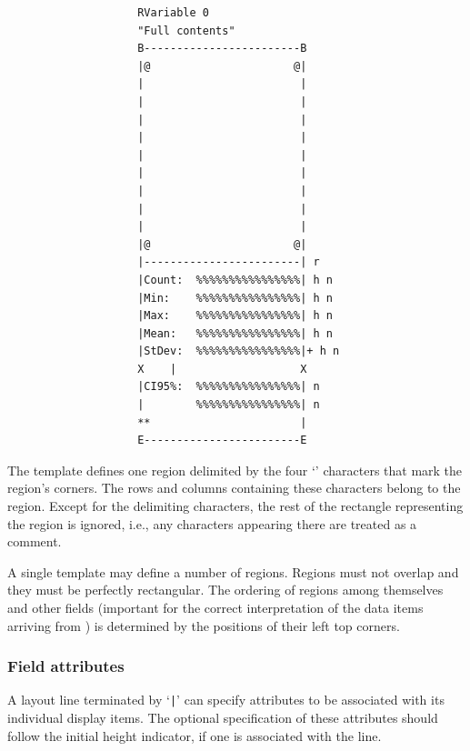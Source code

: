 {\small
\begin{verbatim}
                    RVariable 0
                    "Full contents"
                    B------------------------B
                    |@                      @|
                    |                        |
                    |                        |
                    |                        |
                    |                        |
                    |                        |
                    |                        |
                    |                        |
                    |                        |
                    |                        |
                    |@                      @|
                    |------------------------| r
                    |Count:  %%%%%%%%%%%%%%%%| h n
                    |Min:    %%%%%%%%%%%%%%%%| h n
                    |Max:    %%%%%%%%%%%%%%%%| h n
                    |Mean:   %%%%%%%%%%%%%%%%| h n
                    |StDev:  %%%%%%%%%%%%%%%%|+ h n
                    X    |                   X
                    |CI95%:  %%%%%%%%%%%%%%%%| n
                    |        %%%%%%%%%%%%%%%%| n
                    **                       |
                    E------------------------E
\end{verbatim}}

The template defines one region delimited by the four `{\tt {}}' characters
that mark the region's corners.
The rows and columns containing these characters belong to the region.
Except for the delimiting characters, the rest of the rectangle representing
the region is ignored, i.e.,
any characters appearing there are treated as a comment.

A single template may define a number of regions.
Regions must not overlap and they must be perfectly rectangular.
The ordering of regions among themselves and other fields (important for
the correct interpretation of the data items arriving from \smurph) is
determined by the positions of their left top corners.

\subsubsection{Field attributes}
\label{rm_ds_tp_at}

A layout line terminated by `{\tt |}' can specify attributes to be associated
with its individual display items.
The optional specification of these attributes should follow the initial
height indicator, if one is associated with the line.

